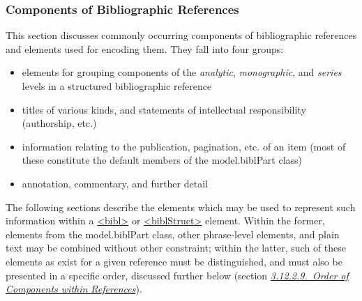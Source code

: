 \subsubsection[{Components of Bibliographic References}]{Components of Bibliographic References}\label{COBICO}\par
This section discusses commonly occurring components of bibliographic references and elements used for encoding them. They fall into four groups: \begin{itemize}
\item elements for grouping components of the \textit{analytic}, \textit{monographic}, and \textit{series} levels in a structured bibliographic reference
\item titles of various kinds, and statements of intellectual responsibility (authorship, etc.)
\item information relating to the publication, pagination, etc. of an item (most of these constitute the default members of the \textsf{model.biblPart} class)
\item annotation, commentary, and further detail
\end{itemize}  The following sections describe the elements which may be used to represent such information within a \hyperref[TEI.bibl]{<bibl>} or \hyperref[TEI.biblStruct]{<biblStruct>} element. Within the former, elements from the \textsf{model.biblPart} class, other phrase-level elements, and plain text may be combined without other constraint; within the latter, such of these elements as exist for a given reference must be distinguished, and must also be presented in a specific order, discussed further below (section \textit{\hyperref[COBICOO]{3.12.2.9.\ Order of Components within References}}).
